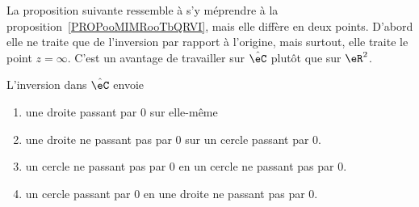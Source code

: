 La proposition suivante ressemble à s'y méprendre à la proposition~\ref{PROPooMIMRooTbQRVI}, mais elle diffère en deux points. D'abord elle ne traite que de l'inversion par rapport à l'origine, mais surtout, elle traite le point \( z=\infty\). C'est un avantage de travailler sur \( \hat \eC\) plutôt que sur \( \eR^2\).
\begin{proposition}     \label{PROPooEAKXooUIqWEv}
	L'inversion dans \( \hat \eC\) envoie
	\begin{enumerate}
		\item
		      une droite passant par \( 0\) sur elle-même
		\item
		      une droite ne passant pas par \( 0\) sur un cercle passant par \( 0\).
		\item
		      un cercle ne passant pas par \( 0\) en un cercle ne passant pas par \( 0\).
		\item
		      un cercle passant par \( 0\) en une droite ne passant pas par \( 0\).
	\end{enumerate}
\end{proposition}

